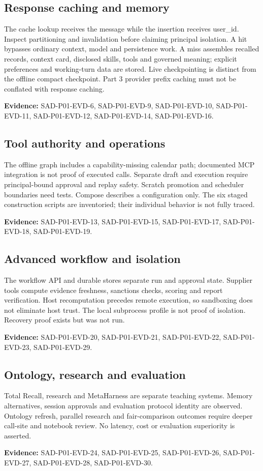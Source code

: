 \documentclass[10pt,letterpaper]{article}
\begin{document}
\subsection{Response caching and memory}
The cache lookup receives the message while the insertion receives user\_id. Inspect partitioning and invalidation before claiming principal isolation. A hit bypasses ordinary context, model and persistence work. A miss assembles recalled records, context card, disclosed skills, tools and governed meaning; explicit preferences and working-turn data are stored. Live checkpointing is distinct from the offline compact checkpoint. Part 3 provider prefix caching must not be conflated with response caching.\par\textbf{Evidence:} SAD-P01-EVD-6, SAD-P01-EVD-9, SAD-P01-EVD-10, SAD-P01-EVD-11, SAD-P01-EVD-12, SAD-P01-EVD-14, SAD-P01-EVD-16.\par

\subsection{Tool authority and operations}
The offline graph includes a capability-missing calendar path; documented MCP integration is not proof of executed calls. Separate draft and execution require principal-bound approval and replay safety. Scratch promotion and scheduler boundaries need tests. Compose describes a configuration only. The six staged construction scripts are inventoried; their individual behavior is not fully traced.\par\textbf{Evidence:} SAD-P01-EVD-13, SAD-P01-EVD-15, SAD-P01-EVD-17, SAD-P01-EVD-18, SAD-P01-EVD-19.\par

\subsection{Advanced workflow and isolation}
The workflow API and durable stores separate run and approval state. Supplier tools compute evidence freshness, sanctions checks, scoring and report verification. Host recomputation precedes remote execution, so sandboxing does not eliminate host trust. The local subprocess profile is not proof of isolation. Recovery proof exists but was not run.\par\textbf{Evidence:} SAD-P01-EVD-20, SAD-P01-EVD-21, SAD-P01-EVD-22, SAD-P01-EVD-23, SAD-P01-EVD-29.\par

\subsection{Ontology, research and evaluation}
Total Recall, research and MetaHarness are separate teaching systems. Memory alternatives, session approvals and evaluation protocol identity are observed. Ontology refresh, parallel research and fair-comparison outcomes require deeper call-site and notebook review. No latency, cost or evaluation superiority is asserted.\par\textbf{Evidence:} SAD-P01-EVD-24, SAD-P01-EVD-25, SAD-P01-EVD-26, SAD-P01-EVD-27, SAD-P01-EVD-28, SAD-P01-EVD-30.\par
\end{document}
